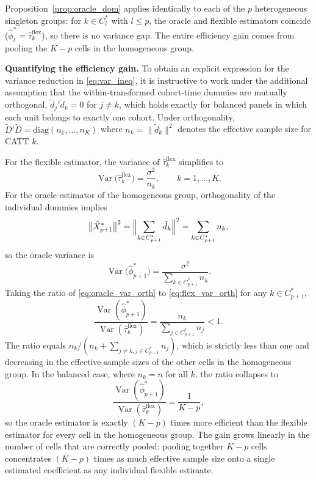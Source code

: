 \documentclass[12pt]{article}
\DeclareMathOperator{\Var}{Var}
\newcommand{\1}{\mathbbm{1}}
\newcommand{\Dtd}{\tilde{D}}
\begin{document}
\noindent Proposition~\ref{prop:oracle_dom} applies identically to each of
the $p$ heterogeneous singleton groups: for $k \in C_l^*$ with
$l \leq p$, the oracle and flexible estimators coincide ($\hat\phi_l^* =
\hat\tau_k^{\text{flex}}$), so there is no variance gap.
The entire efficiency gain comes from pooling the $K-p$ cells in the
homogeneous group.

\bigskip

\noindent\textbf{Quantifying the efficiency gain.}
To obtain an explicit expression for the variance reduction in
\eqref{eq:var_ineq}, it is instructive to work under the additional
assumption that the within-transformed cohort-time dummies are mutually
orthogonal, $\tilde{d}_j'\tilde{d}_k = 0$ for $j \neq k$, which holds
exactly for balanced panels in which each unit belongs to exactly one
cohort.
Under orthogonality, $\Dtd'\Dtd = \mathrm{diag}(n_1,\ldots,n_K)$ where
$n_k = \|\tilde{d}_k\|^2$ denotes the effective sample size for CATT $k$.

For the flexible estimator, the variance of $\hat\tau_k^{\text{flex}}$ simplifies to
\begin{equation}
  \Var\!\bigl(\hat\tau_k^{\text{flex}}\bigr)
  = \frac{\sigma^2}{n_k},
  \qquad k = 1,\ldots,K.
  \label{eq:flex_var_orth}
\end{equation}
For the oracle estimator of the homogeneous group, orthogonality of the
individual dummies implies
\begin{equation}
  \bigl\|\tilde{X}_{p+1}^*\bigr\|^2
  = \Bigl\|\sum_{k\in C_{p+1}^*}\tilde{d}_k\Bigr\|^2
  = \sum_{k\in C_{p+1}^*} n_k,
  \label{eq:oracle_norm}
\end{equation}
so the oracle variance is
\begin{equation}
  \Var\!\bigl(\hat\phi_{p+1}^*\bigr)
  = \frac{\sigma^2}{\displaystyle\sum_{k\in C_{p+1}^*} n_k}.
  \label{eq:oracle_var_orth}
\end{equation}
Taking the ratio of \eqref{eq:oracle_var_orth} to \eqref{eq:flex_var_orth}
for any $k \in C_{p+1}^*$,
\begin{equation}
  \frac{\Var(\hat\phi_{p+1}^*)}{\Var(\hat\tau_k^{\text{flex}})}
  = \frac{n_k}{\displaystyle\sum_{j\in C_{p+1}^*} n_j}
  < 1.
  \label{eq:var_ratio}
\end{equation}
The ratio equals $n_k / (n_k + \sum_{j \neq k, j \in C_{p+1}^*} n_j)$,
which is strictly less than one and decreasing in the effective sample sizes
of the other cells in the homogeneous group.
In the balanced case, where $n_k = n$ for all $k$, the ratio collapses to
\begin{equation}
  \frac{\Var(\hat\phi_{p+1}^*)}{\Var(\hat\tau_k^{\text{flex}})}
  = \frac{1}{K - p},
  \label{eq:var_ratio_balanced}
\end{equation}
so the oracle estimator is exactly $(K-p)$ times more efficient than the
flexible estimator for every cell in the homogeneous group.
The gain grows linearly in the number of cells that are correctly pooled:
pooling together $K-p$ cells concentrates $(K-p)$ times as much effective
sample size onto a single estimated coefficient as any individual flexible
estimate.
\end{document}
